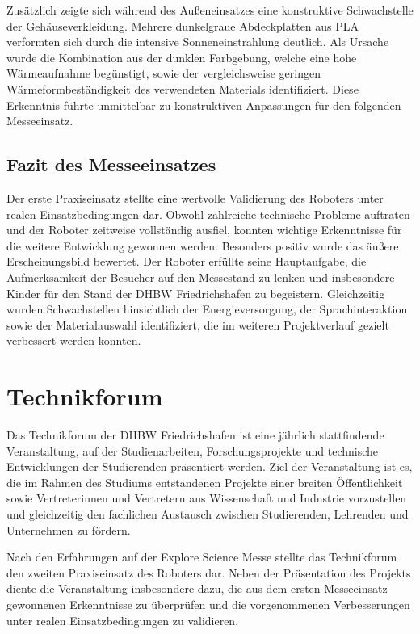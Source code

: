 Zusätzlich zeigte sich während des Außeneinsatzes eine konstruktive Schwachstelle der Gehäuseverkleidung. Mehrere dunkelgraue Abdeckplatten aus PLA verformten sich durch die intensive Sonneneinstrahlung deutlich. Als Ursache wurde die Kombination aus der dunklen Farbgebung, welche eine hohe Wärmeaufnahme begünstigt, sowie der vergleichsweise geringen Wärmeformbeständigkeit des verwendeten Materials identifiziert. Diese Erkenntnis führte unmittelbar zu konstruktiven Anpassungen für den folgenden Messeeinsatz.

\subsection*{Fazit des Messeeinsatzes}

Der erste Praxiseinsatz stellte eine wertvolle Validierung des Roboters unter realen Einsatzbedingungen dar. Obwohl zahlreiche technische Probleme auftraten und der Roboter zeitweise vollständig ausfiel, konnten wichtige Erkenntnisse für die weitere Entwicklung gewonnen werden. Besonders positiv wurde das äußere Erscheinungsbild bewertet. Der Roboter erfüllte seine Hauptaufgabe, die Aufmerksamkeit der Besucher auf den Messestand zu lenken und insbesondere Kinder für den Stand der DHBW Friedrichshafen zu begeistern. Gleichzeitig wurden Schwachstellen hinsichtlich der Energieversorgung, der Sprachinteraktion sowie der Materialauswahl identifiziert, die im weiteren Projektverlauf gezielt verbessert werden konnten.




\section{Technikforum}

Das Technikforum der DHBW Friedrichshafen ist eine jährlich stattfindende Veranstaltung, auf der Studienarbeiten, Forschungsprojekte und technische Entwicklungen der Studierenden präsentiert werden. Ziel der Veranstaltung ist es, die im Rahmen des Studiums entstandenen Projekte einer breiten Öffentlichkeit sowie Vertreterinnen und Vertretern aus Wissenschaft und Industrie vorzustellen und gleichzeitig den fachlichen Austausch zwischen Studierenden, Lehrenden und Unternehmen zu fördern.

Nach den Erfahrungen auf der Explore Science Messe stellte das Technikforum den zweiten Praxiseinsatz des Roboters dar. Neben der Präsentation des Projekts diente die Veranstaltung insbesondere dazu, die aus dem ersten Messeeinsatz gewonnenen Erkenntnisse zu überprüfen und die vorgenommenen Verbesserungen unter realen Einsatzbedingungen zu validieren.


